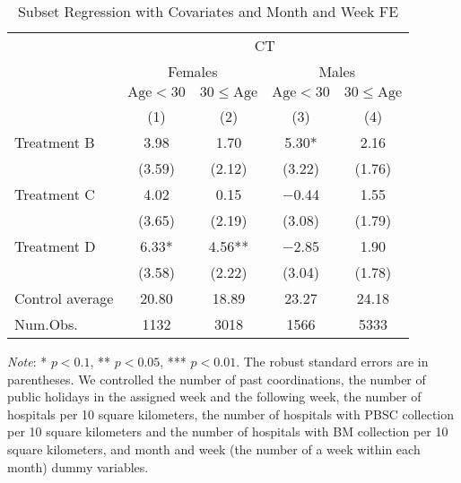\documentclass[12pt, a4paper]{article}
\begin{document}
\begin{table}[H]

\caption{\label{tab:test-lm-subset2}Subset Regression with Covariates and Month and Week FE}
\centering
\fontsize{8}{10}\selectfont
\begin{threeparttable}
\begin{tabular}[t]{lcccc}
\toprule
\multicolumn{1}{c}{ } & \multicolumn{4}{c}{CT} \\
\cmidrule(l{3pt}r{3pt}){2-5}
\multicolumn{1}{c}{ } & \multicolumn{2}{c}{Females} & \multicolumn{2}{c}{Males} \\
\cmidrule(l{3pt}r{3pt}){2-3} \cmidrule(l{3pt}r{3pt}){4-5}
\multicolumn{1}{c}{ } & \multicolumn{1}{c}{$\text{Age} < 30$} & \multicolumn{1}{c}{$30 \le \text{Age}$} & \multicolumn{1}{c}{$\text{Age} < 30$} & \multicolumn{1}{c}{$30 \le \text{Age}$} \\
\cmidrule(l{3pt}r{3pt}){2-2} \cmidrule(l{3pt}r{3pt}){3-3} \cmidrule(l{3pt}r{3pt}){4-4} \cmidrule(l{3pt}r{3pt}){5-5}
  & (1) & (2) & (3) & (4)\\
\midrule
Treatment B & \num{3.98} & \num{1.70} & \num{5.30}* & \num{2.16}\\
 & (\num{3.59}) & (\num{2.12}) & (\num{3.22}) & (\num{1.76})\\
Treatment C & \num{4.02} & \num{0.15} & \num{-0.44} & \num{1.55}\\
 & (\num{3.65}) & (\num{2.19}) & (\num{3.08}) & (\num{1.79})\\
Treatment D & \num{6.33}* & \num{4.56}** & \num{-2.85} & \num{1.90}\\
 & (\num{3.58}) & (\num{2.22}) & (\num{3.04}) & (\num{1.78})\\
\midrule
Control average & 20.80 & 18.89 & 23.27 & 24.18\\
Num.Obs. & \num{1132} & \num{3018} & \num{1566} & \num{5333}\\
\bottomrule
\end{tabular}
\begin{tablenotes}
\item \emph{Note}: * $p < 0.1$, ** $p < 0.05$, *** $p < 0.01$. The robust standard errors are in parentheses. We controlled the number of past coordinations, the number of public holidays in the assigned week and the following week, the number of hospitals per 10 square kilometers, the number of hospitals with PBSC collection per 10 square kilometers and the number of hospitals with BM collection per 10 square kilometers, and month and week (the number of a week within each month) dummy variables.
\end{tablenotes}
\end{threeparttable}
\end{table}
\end{document}
